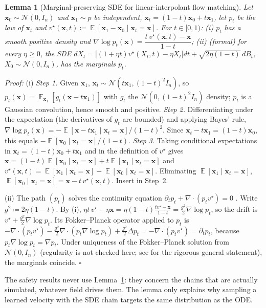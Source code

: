 \documentclass{article}
\DeclareMathOperator{\E}{\mathbb{E}}
\newcommand{\bx}{\mathbf{x}}
\theoremstyle{plain}
\newtheorem{lemma}{Lemma}
\begin{document}
\begin{lemma}[Marginal-preserving SDE for linear-interpolant flow matching]\label{lem:sde}
Let $\bx_0\sim\mathcal{N}(0,I_n)$ and $\bx_1\sim p$ be independent, $\bx_t=(1-t)\bx_0+t\bx_1$, let $p_t$ be the
law of $\bx_t$ and $v^\star(\bx,t)\coloneqq\E[\bx_1-\bx_0\mid\bx_t=\bx]$. For $t\in[0,1)$:
(i) $p_t$ has a smooth positive density and
$\nabla\log p_t(\bx)=\dfrac{t\,v^\star(\bx,t)-\bx}{1-t}$;
(ii) (formal) for every $\eta\geq0$, the SDE
$dX_t=\big[(1+\eta t)v^\star(X_t,t)-\eta X_t\big]dt+\sqrt{2\eta(1-t)}\,dB_t$, $X_0\sim\mathcal{N}(0,I_n)$,
has the marginals $p_t$.
\end{lemma}
\textit{Proof:}
(i) \emph{Step 1.} Given $\bx_1$, $\bx_t\sim\mathcal{N}(t\bx_1,(1-t)^2I_n)$, so
$p_t(\bx)=\E_{\bx_1}[g_t(\bx-t\bx_1)]$ with $g_t$ the $\mathcal{N}(0,(1-t)^2I_n)$ density; $p_t$ is a
Gaussian convolution, hence smooth and positive.
\emph{Step 2.} Differentiating under the expectation (the derivatives of $g_t$ are bounded)
and applying Bayes' rule, $\nabla\log p_t(\bx)=-\E[\bx-t\bx_1\mid\bx_t=\bx]/(1-t)^2$. Since
$\bx_t-t\bx_1=(1-t)\bx_0$, this equals $-\E[\bx_0\mid\bx_t=\bx]/(1-t)$.
\emph{Step 3.} Taking conditional expectations in $\bx_t=(1-t)\bx_0+t\bx_1$ and in the
definition of $v^\star$ gives $\bx=(1-t)\E[\bx_0\mid\bx_t=\bx]+t\E[\bx_1\mid\bx_t=\bx]$ and
$v^\star(\bx,t)=\E[\bx_1\mid\bx_t=\bx]-\E[\bx_0\mid\bx_t=\bx]$. Eliminating $\E[\bx_1\mid\bx_t=\bx]$,
$\E[\bx_0\mid\bx_t=\bx]=\bx-t\,v^\star(\bx,t)$. Insert in Step~2.

(ii) The path $(p_t)$ solves the continuity equation $\partial_tp_t+\nabla\cdot(p_tv^\star)=0$
\citep{lipman2023flow,liu2023flow,albergo2023building}. Write $g^2\coloneqq2\eta(1-t)$. By (i),
$\eta t\,v^\star-\eta\bx=\eta(1-t)\frac{tv^\star-\bx}{1-t}=\frac{g^2}{2}\nabla\log p_t$, so the drift is
$v^\star+\frac{g^2}{2}\nabla\log p_t$. Its Fokker--Planck operator applied to $p_t$ is
$-\nabla\cdot(p_tv^\star)-\frac{g^2}{2}\nabla\cdot(p_t\nabla\log p_t)+\frac{g^2}{2}\Delta p_t=-\nabla\cdot(p_tv^\star)=\partial_tp_t$,
because $p_t\nabla\log p_t=\nabla p_t$. Under uniqueness of the Fokker--Planck solution from
$\mathcal{N}(0,I_n)$ (regularity is not checked here; see \citealt{albergo2025stochastic} for the rigorous
general statement), the marginals coincide. \hfill $\square$

The safety results never use Lemma~\ref{lem:sde}: they concern the chains that are actually
simulated, whatever field drives them. The lemma only explains why sampling a learned
velocity with the SDE chain targets the same distribution as the ODE.
\end{document}
